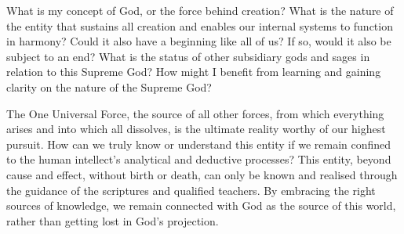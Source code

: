 
\newpage
\begin{mananam}{}
\normalfont\mananamtext What is my concept of God, or the force behind creation? What is the nature of the entity that sustains all creation and enables our internal systems to function in harmony? Could it also have a beginning like all of us? If so, would it also be subject to an end?
What is the status of other subsidiary gods and sages in relation to this Supreme God? How might I benefit from learning and gaining clarity on the nature of the Supreme God?
\end{mananam}
\sreflect
\begin{inspiration}{}
\normalfont\mananamtext The One Universal Force, the source of all other forces, from which everything arises and into which all dissolves, is the ultimate reality worthy of our highest pursuit. How can we truly know or understand this entity if we remain confined to the human intellect’s analytical and deductive processes? This entity, beyond cause and effect, without birth or death, can only be known and realised through the guidance of the scriptures and qualified teachers. By embracing the right sources of knowledge, we remain connected with God as the source of this world, rather than getting lost in God’s projection.
\end{inspiration}
\newpage

